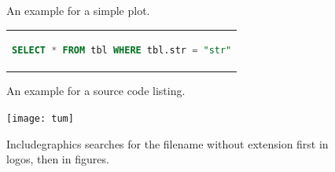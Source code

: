 \begin{figure}[htpb]
  \centering

  \exampleA
  \exampleB
  \caption[Example plot]{An example for a simple plot.}\label{fig:sample-plot}
\end{figure}

\begin{figure}[htpb]
  \centering
  \begin{tabular}{c}
  \begin{lstlisting}[language=SQL]
    SELECT * FROM tbl WHERE tbl.str = "str"
  \end{lstlisting}
  \end{tabular}
  \caption[Example listing]{An example for a source code listing.}\label{fig:sample-listing}
\end{figure}

\begin{figure}[htpb]
  \centering
  \texttt{[image: tum]}
  \caption[Something else can be written here for listing this, otherwise the caption will be written!]{Includegraphics searches for the filename without extension first in logos, then in figures.} \label{fig:tum}
\end{figure}

